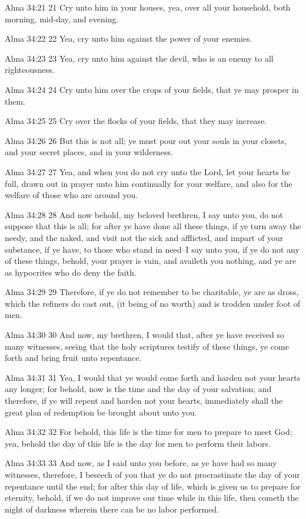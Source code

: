 Alma 34:21
 21 Cry unto him in your houses, yea, over all your household,
both morning, mid-day, and evening.

Alma 34:22
 22 Yea, cry unto him against the power of your enemies.

Alma 34:23
 23 Yea, cry unto him against the devil, who is an enemy to all
righteousness.

Alma 34:24
 24 Cry unto him over the crops of your fields, that ye may
prosper in them.

Alma 34:25
 25 Cry over the flocks of your fields, that they may increase.

Alma 34:26
 26 But this is not all; ye must pour out your souls in your
closets, and your secret places, and in your wilderness.

Alma 34:27
 27 Yea, and when you do not cry unto the Lord, let your hearts
be full, drawn out in prayer unto him continually for your
welfare, and also for the welfare of those who are around you.

Alma 34:28
 28 And now behold, my beloved brethren, I say unto you, do not
suppose that this is all; for after ye have done all these
things, if ye turn away the needy, and the naked, and visit not
the sick and afflicted, and impart of your substance, if ye have,
to those who stand in need--I say unto you, if ye do not any of
these things, behold, your prayer is vain, and availeth you
nothing, and ye are as hypocrites who do deny the faith.

Alma 34:29
 29 Therefore, if ye do not remember to be charitable, ye are as
dross, which the refiners do cast out, (it being of no worth) and
is trodden under foot of men.

Alma 34:30
 30 And now, my brethren, I would that, after ye have received so
many witnesses, seeing that the holy scriptures testify of these
things, ye come forth and bring fruit unto repentance.

Alma 34:31
 31 Yea, I would that ye would come forth and harden not your
hearts any longer; for behold, now is the time and the day of
your salvation; and therefore, if ye will repent and harden not
your hearts, immediately shall the great plan of redemption be
brought about unto you.

Alma 34:32
 32 For behold, this life is the time for men to prepare to meet
God; yea, behold the day of this life is the day for men to
perform their labors.

Alma 34:33
 33 And now, as I said unto you before, as ye have had so many
witnesses, therefore, I beseech of you that ye do not
procrastinate the day of your repentance until the end; for after
this day of life, which is given us to prepare for eternity,
behold, if we do not improve our time while in this life, then
cometh the night of darkness wherein there can be no labor
performed.

